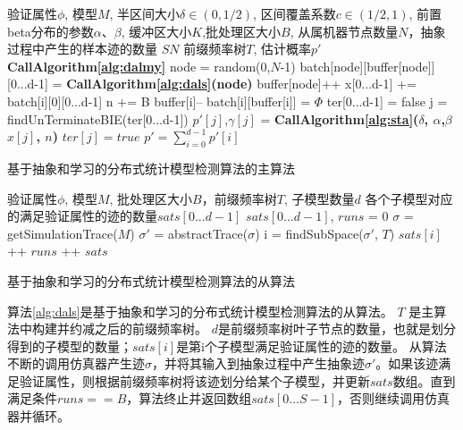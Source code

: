 \begin{algorithm}[t]
\begin{algorithmic}[1]
\REQUIRE 验证属性$\phi$, 模型$M$, 半区间大小$\delta \in (0, 1/2)$, 区间覆盖系数$c \in (1/2, 1)$, 前置beta分布的参数$\alpha$、$\beta$, 缓冲区大小$K$,批处理区大小$B$, 从属机器节点数量$N$，抽象过程中产生的样本迹的数量 $SN$
\ENSURE 前缀频率树$T$, 估计概率$p'$
\STATE \textbf{CallAlgorithm\ref{alg:dalmy}}
\LOOP
        \STATE node = random(0,$N$-1)
           \STATE batch[node][buffer[node]][0...d-1] = \textbf{CallAlgorithm\ref{alg:dals}(node)}
           \STATE buffer[node]++
        \ENDIF
        \LOOP
         \STATE x[0...d-1] += batch[i][0][0...d-1]
          \STATE n += B
           \STATE buffer[i]--
           \STATE batch[i][buffer[i]] = $\Phi$
         \RETURN
         \ENDIF    
         \ENDLOOP
         \ENDIF
          \STATE ter[0...d-1] = false
         \STATE  j = findUnTerminateBIE(ter[0...d-1])
          \STATE $p'[j]$,$\gamma[j]$ = \textbf{CallAlgorithm\ref{alg:sta}($\delta$, $\alpha$,$\beta$ $x[j]$, $n$)}
            \STATE $ter[j] = true$
         \ENDIF
         \RETURN
         \ENDIF
\ENDLOOP
\RETURN $p' = \sum\limits_{i=0}^{d-1} p'[i]$
\end{algorithmic}
\caption{基于抽象和学习的分布式统计模型检测算法的主算法}
\label{alg:dalm}
\end{algorithm}
\begin{algorithm}[t]
\begin{algorithmic}[1]
\REQUIRE 验证属性$\phi$, 模型$M$, 批处理区大小$B$，前缀频率树$T$, 子模型数量$d$
\ENSURE 各个子模型对应的满足验证属性的迹的数量$sats[0...d-1]$
\STATE $sats[0...d-1]$, $runs$ = 0
\LOOP
        \STATE $\sigma$ = getSimulationTrace($M$)
        \STATE $\sigma'$ = abstractTrace($\sigma$)
        \IF{$\sigma \models \phi$}
           \STATE i = findSubSpace($\sigma'$, $T$)
           \STATE $sats[i]$ ++
         \ENDIF
        \STATE $runs$ ++ 
\RETURN $sats$
\ENDIF
\ENDLOOP
\end{algorithmic}
\caption{基于抽象和学习的分布式统计模型检测算法的从算法}
\label{alg:dals}
\end{algorithm}
算法\ref{alg:dals}是基于抽象和学习的分布式统计模型检测算法的从算法。 $T$ 是主算法中构建并约减之后的前缀频率树。 $d$是前缀频率树叶子节点的数量，也就是划分得到的子模型的数量；$sats[i]$是第i个子模型满足验证属性的迹的数量。 从算法不断的调用仿真器产生迹$\sigma$，并将其输入到抽象过程中产生抽象迹$\sigma'$。如果该迹满足验证属性，则根据前缀频率树将该迹划分给某个子模型，并更新$sats$数组。直到满足条件$runs == B$，算法终止并返回数组$sats[0...S-1]$，否则继续调用仿真器并循环。

